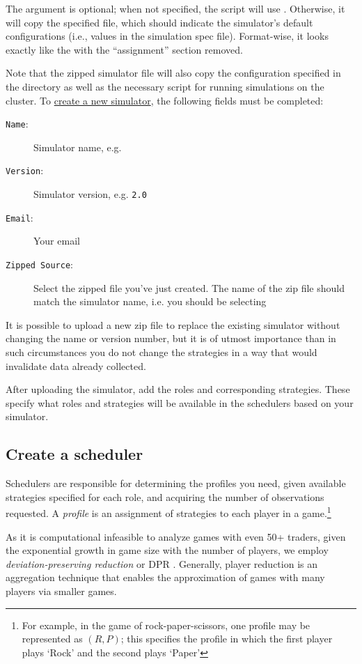 \documentclass[11pt]{article}
\begin{document}
The  argument is optional; when not specified, the script will use . Otherwise, it will copy the specified file, which should indicate the simulator's default configurations (i.e., values in the simulation spec file).
Format-wise, it looks exactly like the  with the ``assignment'' section removed.

Note that the zipped simulator file will also copy the configuration specified in the  directory as well as the necessary  script for running simulations on the cluster.
To \href{http://egtaonline.eecs.umich.edu/simulators/new}{create a new simulator}, the following fields must be completed:
\begin{description}
\item[\texttt{Name}:] Simulator name, e.g. 
\item[\texttt{Version}:] Simulator version, e.g. \verb|2.0|
\item[\texttt{Email}:] Your email
\item[\texttt{Zipped Source}:] Select the zipped file you've just created. The name of the zip file should match the simulator name, i.e. you should be selecting 
\end{description}
It is possible to upload a new zip file to replace the existing simulator without changing the name or version number, but it is of utmost importance than in such circumstances you do not change the strategies in a way that would invalidate data already collected.

After uploading the simulator, add the roles and corresponding strategies. These specify what roles and strategies will be available in the schedulers based on your simulator.

\subsection{Create a scheduler}

Schedulers are responsible for determining the profiles you need, given available strategies specified for each role, and acquiring the number of observations requested.
A \emph{profile} is an assignment of strategies to each player in a game.\footnote{For example, in the game of rock-paper-scissors, one profile may be represented as $(R,P)$; this specifies the profile in which the first player plays `Rock' and the second plays `Paper'}

As it is computational infeasible to analyze games with even 50+ traders, given the exponential growth in game size with the number of players, we employ \emph{deviation-preserving reduction} or DPR \citep{Wiedenbeck2012}.
Generally, player reduction is an aggregation technique that enables the approximation of games with many players via smaller games.
\end{document}
